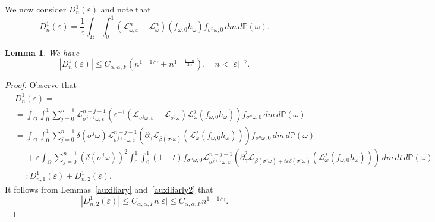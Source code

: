 \documentclass[12pt,reqno,a4paper]{article}
\newtheorem{lemma}[theorem]{Lemma}
\begin{document}
We now consider $D_n^1(\varepsilon)$ and note that 
\[
D_n^1(\varepsilon)=\frac{1}{\varepsilon}\int_\Omega \int_0^1 (\mathcal L_{\omega, \varepsilon}^n-\mathcal L_\omega^n)(f_{\omega, 0}h_\omega) f_{\sigma^n \omega, 0}\, dm\, d\mathbb P(\omega).
\]
\begin{lemma}\label{summability2}
	We have
	\begin{equation}\label{eq:summability2-1}
		|D_n^1(\varepsilon)| \le C_{\alpha, \underline{\alpha}, F}(n^{ 1 - 1 / \gamma }
		+
		n^{1-\frac{1-\alpha}{2\alpha}}), \quad n<|\varepsilon|^{-\gamma}.
	\end{equation}
\end{lemma}
\begin{proof}
	Observe that \begin{equation}\label{D12}
		\begin{split}
			&D_n^1(\varepsilon)= \\
			&=\int_\Omega \int_0^1 \sum_{j=0}^{n-1}\mathcal L_{\sigma^{j+1}\omega, \varepsilon}^{n-j-1}\left (\varepsilon^{-1}(\mathcal L_{\sigma^j \omega, \varepsilon}-\mathcal L_{\sigma^j \omega})\mathcal L_{\omega}^j(f_{\omega, 0}h_\omega)\right)f_{\sigma^n \omega, 0}\, dm\, d\mathbb P(\omega) \\
			&=\int_\Omega\int_0^1 \sum_{j=0}^{n-1}\delta (\sigma^j \omega)\mathcal L_{\sigma^{j+1}\omega, \varepsilon}^{n-j-1}\left (\partial_\gamma \mathcal L_{\beta(\sigma^j \omega)}(\mathcal L_\omega^j(f_{\omega, 0}h_\omega))\right )f_{\sigma^n \omega,0}\, dm\, d\mathbb P(\omega) \\
			&\phantom{=}+\varepsilon\int_\Omega \sum_{j=0}^{n-1}(\delta (\sigma^j \omega))^2\int_0^1 \int_0^1  (1-t) f_{\sigma^n \omega, 0}\mathcal L_{\sigma^{j+1}\omega, \varepsilon}^{n-j-1}(\partial^2_\gamma \mathcal L_{\beta(\sigma^j \omega)+t\varepsilon \delta (\sigma^j \omega)}(\mathcal L_\omega^j(f_{\omega, 0}h_\omega)))\, dm\, dt\, d\mathbb P(\omega) \\
			&=:D_{n,1}^1(\varepsilon)+D_{n, 2}^1(\varepsilon).
		\end{split}
	\end{equation}
	It follows from Lemmas~\ref{auxiliary} and~\ref{auxiliarly2} that
	\begin{equation}\label{fri1}
		|D_{n,2}^1(\varepsilon)| \le C_{\alpha, \underline{\alpha}, F} n|\varepsilon| \le C_{\alpha, \underline{\alpha}, F}n^{1-1/\gamma}.
	\end{equation}
	

\end{proof}
\end{document}
